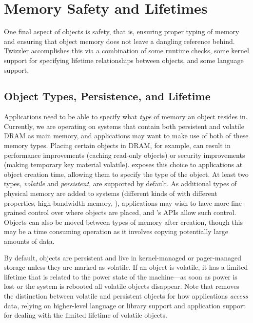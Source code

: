 \section{Memory Safety and Lifetimes}

One final aspect of objects is safety, that is, ensuring proper typing of memory and ensuring that object memory does
not leave a dangling reference behind. Twizzler accomplishes this via a combination of
some runtime checks, some kernel support for specifying lifetime relationships between objects, and some language
support.

\subsection{Object Types, Persistence, and Lifetime}

Applications need to be able to specify what \emph{type} of memory an object resides in. Currently,
we are operating on systems that contain both persistent \NVM and volatile DRAM as main memory, and
applications may want to make use of both of these memory types. Placing certain objects in DRAM,
for example, can result in performance improvements (\eg caching read-only objects) or security
improvements (\eg making temporary key material volatile). \Twizzler exposes this choice to
applications at object creation time, allowing them to specify the type of the object. At least two
types, \emph{volatile} and \emph{persistent}, are supported by default. As additional types of physical memory
are added to systems (\eg different kinds of \NVM with different properties, high-bandwidth memory,
\etc), applications may wish to have more fine-grained control over where objects are placed, and
\Twizzler's APIs allow such control. Objects can also be moved between types of memory after
creation, though this may be a time consuming operation as it involves copying potentially large
amounts of data.

By default, objects are persistent and live in kernel-managed \NVM or pager-managed storage unless they are marked as
volatile. If an object is volatile, it has a limited lifetime that is related to the power state of
the machine---as soon as power is lost or the system is rebooted all volatile objects disappear.
Note that \Twizzler removes the distinction between volatile and persistent objects for how
applications \emph{access} data, relying on higher-level language or library support and application
support for dealing with the limited lifetime of volatile objects.

